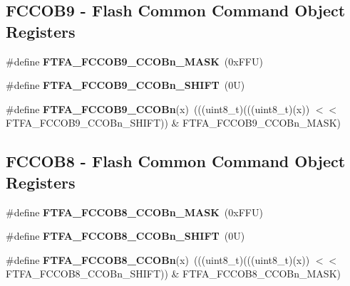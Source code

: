 \subsection*{F\+C\+C\+O\+B9 -\/ Flash Common Command Object Registers}
\begin{DoxyCompactItemize}
\item 
\mbox{\label{group___f_t_f_a___register___masks_ga3d424ebf51a8b74312c01efe408117f1}} 
\#define {\bfseries F\+T\+F\+A\+\_\+\+F\+C\+C\+O\+B9\+\_\+\+C\+C\+O\+Bn\+\_\+\+M\+A\+SK}~(0x\+F\+F\+U)
\item 
\mbox{\label{group___f_t_f_a___register___masks_gae44c6a3215eb5b3a75a5cdd54e570127}} 
\#define {\bfseries F\+T\+F\+A\+\_\+\+F\+C\+C\+O\+B9\+\_\+\+C\+C\+O\+Bn\+\_\+\+S\+H\+I\+FT}~(0\+U)
\item 
\mbox{\label{group___f_t_f_a___register___masks_ga08fe939d39815b4825664858c66e32ff}} 
\#define {\bfseries F\+T\+F\+A\+\_\+\+F\+C\+C\+O\+B9\+\_\+\+C\+C\+O\+Bn}(x)~(((uint8\+\_\+t)(((uint8\+\_\+t)(x)) $<$$<$ F\+T\+F\+A\+\_\+\+F\+C\+C\+O\+B9\+\_\+\+C\+C\+O\+Bn\+\_\+\+S\+H\+I\+FT)) \& F\+T\+F\+A\+\_\+\+F\+C\+C\+O\+B9\+\_\+\+C\+C\+O\+Bn\+\_\+\+M\+A\+SK)
\end{DoxyCompactItemize}
\subsection*{F\+C\+C\+O\+B8 -\/ Flash Common Command Object Registers}
\begin{DoxyCompactItemize}
\item 
\mbox{\label{group___f_t_f_a___register___masks_ga4c40268e4d4ae3bc87a782cbbfc9ec99}} 
\#define {\bfseries F\+T\+F\+A\+\_\+\+F\+C\+C\+O\+B8\+\_\+\+C\+C\+O\+Bn\+\_\+\+M\+A\+SK}~(0x\+F\+F\+U)
\item 
\mbox{\label{group___f_t_f_a___register___masks_ga9603935c5e6f2c1d51b6b4e952e1428a}} 
\#define {\bfseries F\+T\+F\+A\+\_\+\+F\+C\+C\+O\+B8\+\_\+\+C\+C\+O\+Bn\+\_\+\+S\+H\+I\+FT}~(0\+U)
\item 
\mbox{\label{group___f_t_f_a___register___masks_ga30cf95c2ee60990f4f30e05bd0ee29d8}} 
\#define {\bfseries F\+T\+F\+A\+\_\+\+F\+C\+C\+O\+B8\+\_\+\+C\+C\+O\+Bn}(x)~(((uint8\+\_\+t)(((uint8\+\_\+t)(x)) $<$$<$ F\+T\+F\+A\+\_\+\+F\+C\+C\+O\+B8\+\_\+\+C\+C\+O\+Bn\+\_\+\+S\+H\+I\+FT)) \& F\+T\+F\+A\+\_\+\+F\+C\+C\+O\+B8\+\_\+\+C\+C\+O\+Bn\+\_\+\+M\+A\+SK)
\end{DoxyCompactItemize}
